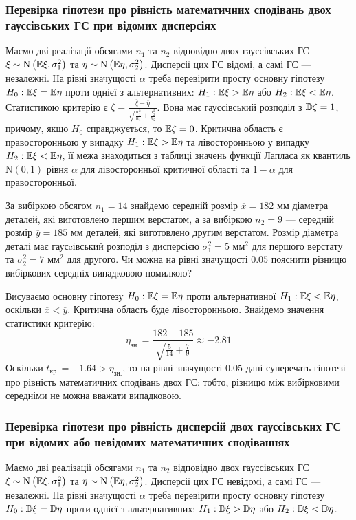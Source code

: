 \subsubsection*{Перевірка гіпотези про рівність математичних сподівань двох гауссівських 
ГС при відомих дисперсіях}
Маємо дві реалізації обсягами $n_1$ та $n_2$ відповідно двох гауссівських ГС
$\xi \sim \mathrm{N}\left(\mathbb{E} \xi, \sigma_1^2\right)$ та $\eta \sim \mathrm{N}\left(\mathbb{E} \eta, \sigma_2^2\right)$.
Дисперсії цих ГС відомі, а самі ГС --- незалежні. На рівні значущості $\alpha$ треба перевірити
просту основну гіпотезу $H_0: \mathbb{E} \xi = \mathbb{E}\eta$ проти однієї з альтернативних:
$H_1 : \mathbb{E}\xi > \mathbb{E}\eta$ або $H_2 : \mathbb{E}\xi < \mathbb{E}\eta$. Статистикою критерію є
$\zeta = \frac{\overline{\xi} - \overline{\eta}}{\sqrt{\frac{\sigma_1^2}{n_1} + \frac{\sigma_2^2}{n_2}}}$. Вона має
гауссівський розподіл з $\mathbb{D}\zeta = 1$, причому, якщо $H_0$ справджується, то $\mathbb{E}\zeta = 0$.
Критична область є правосторонньою у випадку $H_1: \mathbb{E}\xi > \mathbb{E}\eta$ та лівосторонньою у випадку $H_2: \mathbb{E}\xi < \mathbb{E}\eta$,
її межа знаходиться з таблиці значень функції Лапласа як квантиль $\mathrm{N}(0, 1)$ рівня $\alpha$ для лівосторонньої
критичної області та $1-\alpha$ для правосторонньої.
\begin{example}
    За вибіркою обсягом $n_1 = 14$ знайдемо середній розмір $\overline{x} = 182$ мм діаметра деталей,
    які виготовлено першим верстатом, а за вибіркою $n_2 = 9$ --- середній розмір
    $\overline{y} = 185$ мм деталей, які виготовлено другим верстатом. Розмір діаметра деталі
    має гаусcівський розподіл з дисперсією $\sigma_1^2 = 5$ мм$^2$ для першого верстату
    та $\sigma_2^2 = 7$ мм$^2$ для другого. Чи можна на рівні значущості $0.05$ пояснити різницю вибіркових середніх
    випадковою помилкою?

    Висуваємо основну гіпотезу $H_0 : \mathbb{E} \xi = \mathbb{E}\eta$ проти альтернативної
    $H_1 : \mathbb{E}\xi < \mathbb{E}\eta$, оскільки $\overline{x} < \overline{y}$. Критична область буде лівосторонньою.
    Знайдемо значення статистики критерію:
    $$
    \eta_{\text{зн.}} = \frac{182 - 185}{\sqrt{\frac{5}{14} + \frac{7}{9}}} \approx -2.81
    $$
    Оскільки $t_{\text{кр.}} = -1.64 > \eta_{\text{зн.}}$, то на рівні значущості $0.05$ дані суперечать гіпотезі
    про рівність математичних сподівань двох ГС: тобто, різницю між вибірковими середніми не можна вважати випадковою.
\end{example}

\subsubsection*{Перевірка гіпотези про рівність дисперсій двох гауссівських 
ГС при відомих або невідомих математичних сподіваннях}
Маємо дві реалізації обсягами $n_1$ та $n_2$ відповідно двох гауссівських ГС
$\xi \sim \mathrm{N}\left(\mathbb{E} \xi, \sigma_1^2\right)$ та $\eta \sim \mathrm{N}\left(\mathbb{E} \eta, \sigma_2^2\right)$.
Дисперсії цих ГС невідомі, а самі ГС --- незалежні. На рівні значущості $\alpha$ треба перевірити
просту основну гіпотезу $H_0: \mathbb{D} \xi = \mathbb{D} \eta$ проти однієї з альтернативних:
$H_1 : \mathbb{D}\xi > \mathbb{D}\eta$ або $H_2 : \mathbb{D}\xi < \mathbb{D}\eta$. 

